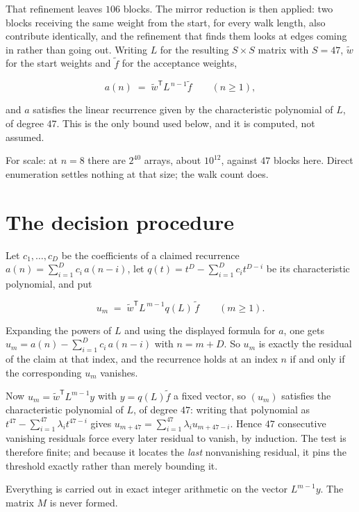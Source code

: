 \documentclass[11pt]{article}
\theoremstyle{definition}
\begin{document}
That refinement leaves $106$ blocks. The mirror reduction is then applied: two blocks receiving the same weight from the start, for every walk length, also contribute identically, and the refinement that finds them looks at edges coming in rather than going out. Writing $L$ for the resulting $S \times S$ matrix with $S = 47$, $\tilde w$ for the start weights and $\tilde f$ for the acceptance weights,

\[a(n) \;=\; \tilde w^{\mathsf T} L^{\,n-1} \tilde f \qquad (n \ge 1),\]

and $a$ satisfies the linear recurrence given by the characteristic polynomial of $L$, of degree $47$. This is the only bound used below, and it is computed, not assumed.

For scale: at $n = 8$ there are $2^{40}$ arrays, about $10^{12}$, against $47$ blocks here. Direct enumeration settles nothing at that size; the walk count does.

\section{The decision procedure}

Let $c_1,\dots,c_D$ be the coefficients of a claimed recurrence $a(n) = \sum_{i=1}^{D} c_i\,a(n-i)$, let $q(t) = t^{D} - \sum_{i=1}^{D} c_i t^{D-i}$ be its characteristic polynomial, and put

\[u_m \;=\; \tilde w^{\mathsf T} L^{\,m-1} q(L)\,\tilde f \qquad (m \ge 1).\]

Expanding the powers of $L$ and using the displayed formula for $a$, one gets $u_m = a(n) - \sum_{i=1}^{D} c_i\,a(n-i)$ with $n = m + D$. So $u_m$ is exactly the residual of the claim at that index, and the recurrence holds at an index $n$ if and only if the corresponding $u_m$ vanishes.

Now $u_m = \tilde w^{\mathsf T} L^{m-1} y$ with $y = q(L)\tilde f$ a fixed vector, so $(u_m)$ satisfies the characteristic polynomial of $L$, of degree $47$: writing that polynomial as $t^{47} - \sum_{i=1}^{47} \lambda_i t^{47-i}$ gives $u_{m+47} = \sum_{i=1}^{47} \lambda_i u_{m+47-i}$. Hence $47$ consecutive vanishing residuals force every later residual to vanish, by induction. The test is therefore finite; and because it locates the {\itshape last} nonvanishing residual, it pins the threshold exactly rather than merely bounding it.

Everything is carried out in exact integer arithmetic on the vector $L^{m-1}y$. The matrix $M$ is never formed.
\end{document}
